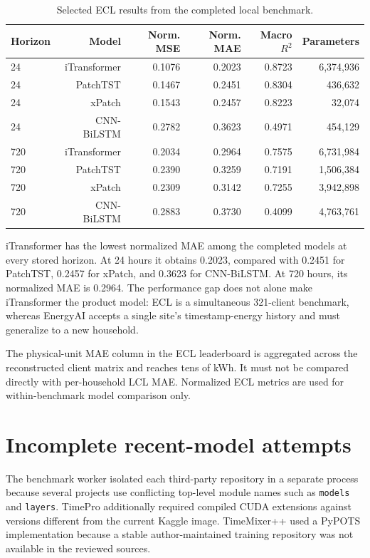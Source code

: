 \begin{table}[H]
\centering
\caption{Selected ECL results from the completed local benchmark.}
\label{tab:eclresults}
\begin{tabular}{lrrrrr}
\toprule
Horizon & Model & Norm. MSE & Norm. MAE & Macro $R^2$ & Parameters \\
\midrule
24 & iTransformer & 0.1076 & 0.2023 & 0.8723 & 6,374,936 \\
24 & PatchTST & 0.1467 & 0.2451 & 0.8304 & 436,632 \\
24 & xPatch & 0.1543 & 0.2457 & 0.8223 & 32,074 \\
24 & CNN-BiLSTM & 0.2782 & 0.3623 & 0.4971 & 454,129 \\
720 & iTransformer & 0.2034 & 0.2964 & 0.7575 & 6,731,984 \\
720 & PatchTST & 0.2390 & 0.3259 & 0.7191 & 1,506,384 \\
720 & xPatch & 0.2309 & 0.3142 & 0.7255 & 3,942,898 \\
720 & CNN-BiLSTM & 0.2883 & 0.3730 & 0.4099 & 4,763,761 \\
\bottomrule
\end{tabular}
\end{table}

iTransformer has the lowest normalized MAE among the completed models at every stored horizon. At 24 hours it obtains 0.2023, compared with 0.2451 for PatchTST, 0.2457 for xPatch, and 0.3623 for CNN-BiLSTM. At 720 hours, its normalized MAE is 0.2964. The performance gap does not alone make iTransformer the product model: ECL is a simultaneous 321-client benchmark, whereas EnergyAI accepts a single site's timestamp-energy history and must generalize to a new household.

The physical-unit MAE column in the ECL leaderboard is aggregated across the reconstructed client matrix and reaches tens of kWh. It must not be compared directly with per-household LCL MAE. Normalized ECL metrics are used for within-benchmark model comparison only.

\section{Incomplete recent-model attempts}

The benchmark worker isolated each third-party repository in a separate process because several projects use conflicting top-level module names such as \texttt{models} and \texttt{layers}. TimePro additionally required compiled CUDA extensions against versions different from the current Kaggle image. TimeMixer++ used a PyPOTS implementation because a stable author-maintained training repository was not available in the reviewed sources.

